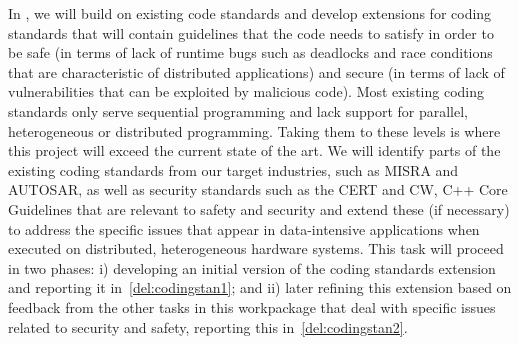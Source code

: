 \begin{Workpackage}{\thewpno}
\begin{Task}
\TaskResults{
\ref{del:codingstan1}
\ref{del:codingstan2}
}
\TaskHeader{}
In \theTask, we will build on existing code standards and develop extensions for coding standards that will 
contain guidelines that the code needs to satisfy in order to be safe (in terms of lack 
of runtime bugs such as deadlocks and race conditions that
are characteristic of distributed applications) and secure (in terms of lack of vulnerabilities
that can be exploited by malicious code).
Most existing coding standards only serve sequential programming and lack support for parallel, heterogeneous or distributed programming. Taking them to these levels is where this project will exceed the current state of the art.
We will identify parts of the existing coding standards from
our target industries, such as MISRA and AUTOSAR, as well as security standards such as the CERT and CW, C++ Core Guidelines 
that are relevant to safety and security and extend these (if necessary) to address the specific issues that 
appear in data-intensive applications when executed on distributed, heterogeneous hardware systems. 
This task will proceed in two phases: i) developing an initial version
of the coding standards extension and reporting it in~\ref{del:codingstan1}; and ii) later refining this extension based on
feedback from the other tasks in this workpackage that deal with specific issues related to
security and safety, reporting this in~\ref{del:codingstan2}.
\end{Task}


\end{Workpackage}
